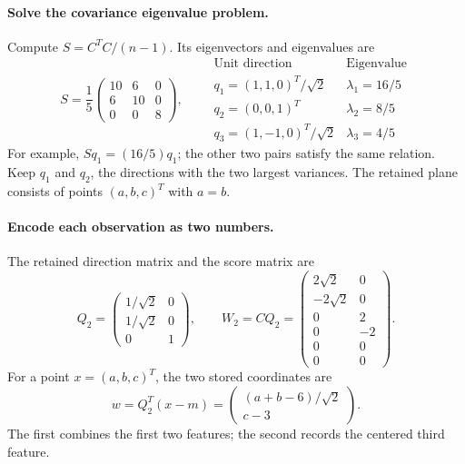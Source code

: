 \documentclass[11pt]{article}
\begin{document}
\paragraph{Solve the covariance eigenvalue problem.}
Compute $S=C^TC/(n-1)$. Its eigenvectors and eigenvalues are
\[
 S=\frac15\begin{pmatrix}10&6&0\\6&10&0\\0&0&8\end{pmatrix},\qquad
 \begin{array}{c|c}
 \text{Unit direction}&\text{Eigenvalue}\\\hline
 q_1=(1,1,0)^T/\sqrt2&\lambda_1=16/5\\[0.2em]
 q_2=(0,0,1)^T&\lambda_2=8/5\\[0.2em]
 q_3=(1,-1,0)^T/\sqrt2&\lambda_3=4/5
 \end{array}
\]
For example, $Sq_1=(16/5)q_1$; the other two pairs satisfy the same
relation. Keep $q_1$ and $q_2$, the directions with the two largest variances.
The retained plane consists of points $(a,b,c)^T$ with $a=b$.

\paragraph{Encode each observation as two numbers.}
The retained direction matrix and the score matrix are
\[
 Q_2=\begin{pmatrix}
 1/\sqrt2&0\\1/\sqrt2&0\\0&1
 \end{pmatrix},\qquad
 W_2=CQ_2=\begin{pmatrix}
 2\sqrt2&0\\-2\sqrt2&0\\0&2\\0&-2\\0&0\\0&0
 \end{pmatrix}.
\]
For a point $x=(a,b,c)^T$, the two stored coordinates are
\[
 w=Q_2^T(x-m)
 =\begin{pmatrix}(a+b-6)/\sqrt2\\c-3\end{pmatrix}.
\]
The first combines the first two features; the second records the centered
third feature.
\end{document}
